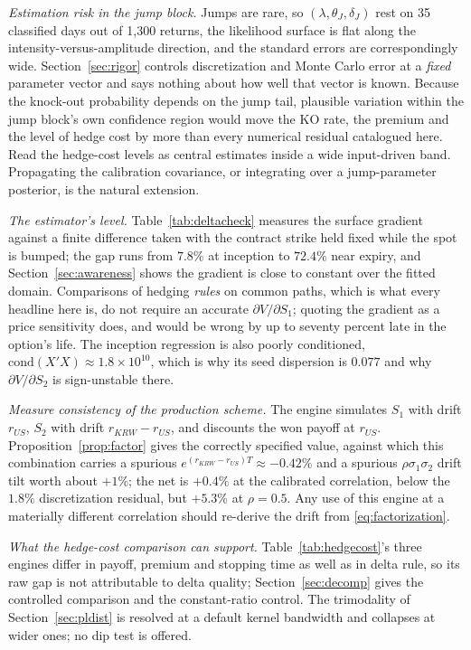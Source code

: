 \documentclass[11pt,a4paper]{article}
\begin{document}
\emph{Estimation risk in the jump block.} Jumps are rare, so $(\lambda,\theta_J,\delta_J)$ rest on 35 classified days out of 1{,}300 returns, the likelihood surface is flat along the intensity-versus-amplitude direction, and the standard errors are correspondingly wide. Section~\ref{sec:rigor} controls discretization and Monte Carlo error at a \emph{fixed} parameter vector and says nothing about how well that vector is known. Because the knock-out probability depends on the jump tail, plausible variation within the jump block's own confidence region would move the KO rate, the premium and the level of hedge cost by more than every numerical residual catalogued here. Read the hedge-cost levels as central estimates inside a wide input-driven band. Propagating the calibration covariance, or integrating over a jump-parameter posterior, is the natural extension.

\emph{The estimator's level.} Table~\ref{tab:deltacheck} measures the surface gradient against a finite difference taken with the contract strike held fixed while the spot is bumped; the gap runs from $7.8\%$ at inception to $72.4\%$ near expiry, and Section~\ref{sec:awareness} shows the gradient is close to constant over the fitted domain. Comparisons of hedging \emph{rules} on common paths, which is what every headline here is, do not require an accurate $\partial V/\partial S_1$; quoting the gradient as a price sensitivity does, and would be wrong by up to seventy percent late in the option's life. The inception regression is also poorly conditioned, $\mathrm{cond}(X'X)\approx1.8\times10^{10}$, which is why its seed dispersion is $0.077$ and why $\partial V/\partial S_2$ is sign-unstable there.

\emph{Measure consistency of the production scheme.} The engine simulates $S_1$ with drift $r_{US}$, $S_2$ with drift $r_{KRW}-r_{US}$, and discounts the won payoff at $r_{US}$. Proposition~\ref{prop:factor} gives the correctly specified value, against which this combination carries a spurious $e^{(r_{KRW}-r_{US})T}\approx-0.42\%$ and a spurious $\rho\sigma_1\sigma_2$ drift tilt worth about $+1\%$; the net is $+0.4\%$ at the calibrated correlation, below the $1.8\%$ discretization residual, but $+5.3\%$ at $\rho=0.5$. Any use of this engine at a materially different correlation should re-derive the drift from \eqref{eq:factorization}.

\emph{What the hedge-cost comparison can support.} Table~\ref{tab:hedgecost}'s three engines differ in payoff, premium and stopping time as well as in delta rule, so its raw gap is not attributable to delta quality; Section~\ref{sec:decomp} gives the controlled comparison and the constant-ratio control. The trimodality of Section~\ref{sec:pldist} is resolved at a default kernel bandwidth and collapses at wider ones; no dip test is offered.
\end{document}
